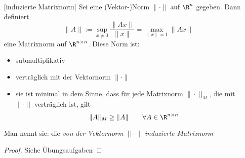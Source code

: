 \documentclass[a4paper]{scrartcl}
\numberwithin{equation}{section}
\begin{document}
\begin{st}
	\label{st:2.12}[induzierte Matrixnorm]
Sei eine (Vektor-)Norm $\|\cdot\|$ auf $\R^n$ gegeben.
Dann definiert
\[
\|A\|:=\sup_{x\neq 0}\frac{\|Ax\|}{\|x\|} = \max_{\|x\|=1}\|Ax\|
\]
eine Matrixnorm auf $\R^{n\times n}$.
Diese Norm ist:
\begin{itemize}
\item submultiplikativ
\item verträglich mit der Vektornorm $\|\cdot\|$
\item sie ist minimal in dem Sinne, dass für jede Matrixnorm $\|\cdot\|_M$, die mit $\|\cdot\|$ verträglich ist, gilt
\[
\|A\|_M\ge \|A\| \qquad \forall A\in\R^{n\times n}
\]
\end{itemize}
\begin{note}
Man nennt sie: die \emph{von der Vektornorm $\|\cdot\|$ induzierte Matrixnorm}
\end{note}
\begin{proof}
Siehe Übungsaufgaben
\end{proof}
\end{st}
\end{document}
